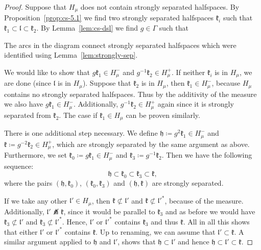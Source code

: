 \begin{proof}
  Suppose that \(H_\mu\) does not contain strongly separated halfspaces. By Proposition\ \ref{prop:cs-5.1} we find two strongly separated halfspaces \(\mathfrak{k}_i\) such that \(\mathfrak{k}_1 \subset \mathfrak{l} \subset \mathfrak{k}_2\). By Lemma~\ref{lem:cs-dsl} we find \(g \in \Gamma\) such that
  \begin{center}
    
  \end{center}
  The arcs in the diagram connect strongly separated halfspaces which were identified using Lemma~\ref{lem:strongly-sep}.

  We would like to show that \(g\mathfrak{k}_1 \in H_\mu^-\) and \(g^{-1}\mathfrak{k}_2 \in H_\mu^+\). If neither \(\mathfrak{k}_i\) is in \(H_\mu\), we are done (since \(\mathfrak{l}\) is in \(H_\mu\)). Suppose that \(\mathfrak{k}_2\) is in \(H_\mu\), then \(\mathfrak{k}_1 \in H_\mu^-\), because \(H_\mu\) contains no strongly separated halfspaces. Thus by the additivity of the measure we also have \(g\mathfrak{k}_1 \in H_\mu^-\). Additionally, \(g^{-1}\mathfrak{k}_2 \in H_\mu^+\) again since it is strongly separated from \(\mathfrak{k}_2\). The case if \(\mathfrak{k}_1 \in H_\mu\) can be proven similarly.

  There is one additional step necessary. We define \(\mathfrak{h} \coloneqq g^2\mathfrak{k}_1 \in H_\mu^-\) and \(\mathfrak{k} \coloneqq g^{-2}\mathfrak{k}_2 \in H_\mu^+\), which are strongly separated by the same argument as above. Furthermore, we set \(\mathfrak{k_0} \coloneqq g\mathfrak{k}_1 \in H_\mu^-\) and \(\mathfrak{k}_3 \coloneqq g^{-1}\mathfrak{k}_2\). Then we have the following sequence:
  \[
    \mathfrak{h} \subset \mathfrak{k}_0 \subset \mathfrak{k}_3 \subset \mathfrak{k},
  \]
  where the pairs \((\mathfrak{h}, \mathfrak{k}_0)\), \((\mathfrak{k_0}, \mathfrak{k}_3)\) and \((\mathfrak{h}, \mathfrak{k})\) are strongly separated. 

  If we take any other \(\mathfrak{l}' \in H_\mu\), then \(\mathfrak{k} \not\subset \mathfrak{l}'\) and \(\mathfrak{k} \not \subset \mathfrak{l}'^\ast\), because of the measure. Additionally, \(\mathfrak{l}' \not\pitchfork \mathfrak{k}\), since it would be parallel to \(\mathfrak{k}_3\) and as before we would have \(\mathfrak{k}_3 \not\subset \mathfrak{l}'\) and \(\mathfrak{k}_3 \not\subset \mathfrak{l}'^\ast\). Hence, \(\mathfrak{l}'\) or \(\mathfrak{l}'^\ast\) contains \(\mathfrak{k}_3\) and thus \(\mathfrak{k}\). All in all this shows that either \(\mathfrak{l}'\) or \(\mathfrak{l}'^\ast\) contains \(\mathfrak{k}\). Up to renaming, we can assume that \(\mathfrak{l}' \subset \mathfrak{k}\). A similar argument applied to \(\mathfrak{h}\) and \(\mathfrak{l}'\), shows that \(\mathfrak{h} \subset \mathfrak{l}'\) and hence \(\mathfrak{h} \subset \mathfrak{l}' \subset \mathfrak{k}\).
\end{proof}


